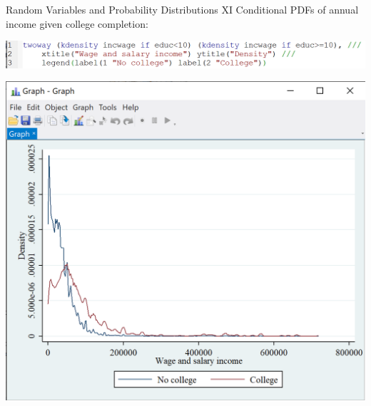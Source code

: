 \documentclass[11pt,english,handout]{beamer}
\begin{document}
\begin{frame}{Random Variables and Probability Distributions XI}
\vspace{0.2cm}
Conditional PDFs of annual income given college completion:

\begin{center}
\includegraphics[scale=0.6]{stata12.png} 

\includegraphics[scale=0.55]{stata13.png}
\end{center}

\end{frame}
\end{document}

